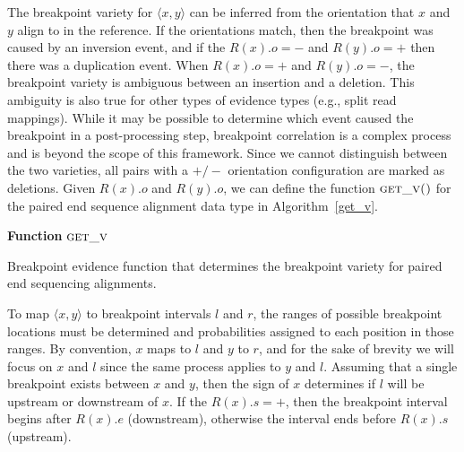 \documentclass[11pt]{article}
\begin{document}
The breakpoint variety for $\langle x,y \rangle$ can be inferred from the 
orientation that $x$ and $y$ align to in the reference.  If the orientations
match, then the breakpoint was caused by an inversion event, and if the
$R(x).o=-$ and $R(y).o=+$ then there was a duplication event.  When $R(x).o=+$
and $R(y).o=-$, the breakpoint variety is ambiguous between an insertion and a
deletion.  This ambiguity is also true for other types of evidence types (e.g.,
split read mappings).  While it may be possible to determine which event caused
the breakpoint in a post-processing step, breakpoint correlation is a complex
process and is beyond the scope of this framework.  Since we cannot distinguish
between the two varieties, all pairs with a $+/-$ orientation configuration are
marked as deletions.  Given $R(x).o$ and $R(y).o$, we can define the
function $\textsc{get\_v()}$ for the paired end sequence alignment
data type in Algorithm~\ref{get_v}.

\begin{algorithm}[H]
    \DontPrintSemicolon
    \footnotesize
    \BlankLine
    \textbf{Function} $\textsc{get\_v}$\;
	\caption{Breakpoint evidence function that determines the breakpoint variety
			 for paired end sequencing alignments.}
    \label{get_v}
\end{algorithm}

To map $\langle x,y \rangle$ to breakpoint intervals $l$ and $r$, the ranges of
possible breakpoint locations must be determined and probabilities assigned to
each position in those ranges.  By convention, $x$ maps to $l$ and $y$ to
$r$, and for the sake of brevity we will focus on $x$ and $l$ since the same
process applies to $y$ and $l$.  Assuming that a single breakpoint exists
between $x$ and $y$, then the sign of $x$ determines if $l$ will be upstream
or downstream of $x$.  If the $R(x).s=+$, then the breakpoint interval begins
after $R(x).e$ (downstream), otherwise the interval ends before $R(x).s$
(upstream).  
\end{document}
